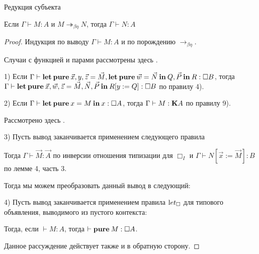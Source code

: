 \begin{theorem} Редукция субъекта

Если $\Gamma \vdash M : A$ и $M \twoheadrightarrow_{\beta \eta} N$, тогда $\Gamma \vdash N : A$

\end{theorem}

\begin{proof}

Индукция по выводу $\Gamma \vdash M : A$ и по порождению $\rightarrow_{\beta \eta}$.

Случаи с функцией и парами рассмотрены здесь \cite{Morten} \cite{Pierce}.

1) Если $\Gamma \vdash {\bf let \: pure \:} \vec{x}, y, \vec{z} = \vec{M}, {\bf let \: pure \: } \vec{w} = \vec{N} {\bf \: in \: } Q, \vec{P}  {\: \bf in \:} R : \Box B$,
тогда $\Gamma \vdash {\bf let \: pure \:} \vec{x}, \vec{w}, \vec{z} = \vec{M}, \vec{N}, \vec{P} \: { \bf in } \: R [y := Q] : \Box B$ по правилу 4).

2) Если $\Gamma \vdash {\bf let \: pure \:} x = M {\: \bf in \: } x : \Box A$, тогда $\Gamma \vdash M : {\bf K}A$ по правилу 9).

Рассмотрено здесь \cite{ModalK}.

3) Пусть вывод заканчивается применением следующего правила

\begin{prooftree}
\end{prooftree}

Тогда $\Gamma \vdash \vec{M} : \vec{A}$ по инверсии отношения типизации для $\Box_I$ и $\Gamma \vdash N [\vec{x} := \vec{M}] : B$ по лемме 4, часть 3.

Тогда мы можем преобразовать данный вывод в следующий:

\begin{prooftree}
\end{prooftree}

4) Пусть вывод заканчивается применением правила ${\text let}_{\Box}$ для типового объявления, выводимого из пустого контекста:

\begin{prooftree}
\end{prooftree}

Тогда, если $\vdash M : A$, тогда $\vdash {\bf pure \:} M : \Box A$.

Данное рассуждение действует также и в обратную сторону.
\end{proof}

